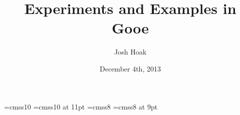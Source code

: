 \documentclass[a5paper]{article}
\begin{document}
\title{Experiments and Examples in Gooe}
\date{December 4th, 2013}
\author{Josh Hoak}
\maketitle

\font\tenpoint=cmss10
\font\tenpointeleven=cmss10 at 11pt
\font\eightpoint=cmss8
\font\eightpointnine=cmss8 at 9pt

\newdimen\bigRaise
\bigRaise=4.0pt
\newdimen\smallRaise
\smallRaise=3.5pt
\newdimen\inlineRaise
\inlineRaise=3.5pt

\def\eLblBig#1{\leavevmode\hbox to \goIntWd{
  \hss\raise\bigRaise\hbox{\rm \tenpointeleven{#1}}\hss}}
\def\goWsLblBig#1{\setbox0=\hbox{\0??!}
  \rlap{\0??!}\raise\bigRaise\hbox to \wd0{\hss\tenpointeleven{#1}\hss}}
\def\goBsLblBig#1{\setbox0=\hbox{\0??@}
  \rlap{\0??@}\raise\bigRaise\hbox to \wd0{\hss\color{white}
  \tenpointeleven{#1}\color{white}\hss}}

\def\eLbl#1{\leavevmode\hbox to \goIntWd{
  \hss\raise\smallRaise\hbox{\rm \tenpoint{#1}}\hss}}
\def\goWsLbl#1{\setbox0=\hbox{\0??!}
  \rlap{\0??!}\raise\smallRaise\hbox to \wd0{\hss\eightpointnine{#1}\hss}}
\def\goBsLbl#1{\setbox0=\hbox{\0??@}
  \rlap{\0??@}\raise\smallRaise\hbox to \wd0{\hss\color{white}
  \eightpointnine{#1}\color{white}\hss}}

\def\goinWsLbl#1{\textstone{\goo {\setbox0=\hbox{\0??!}
  \rlap{\0??!}\raise\inlineRaise\hbox to \wd0{\hss\eightpoint{#1}\hss}}}}
\def\goinBsLbl#1{\textstone{\goo {\setbox0=\hbox{\0??@}
  \rlap{\0??@}\raise\inlineRaise\hbox to \wd0{\hss\color{white}
  \eightpoint{#1}\color{white}\hss}}}}
\def\goinChar#1{\textstone{\goo {#1}}}

\end{document}
